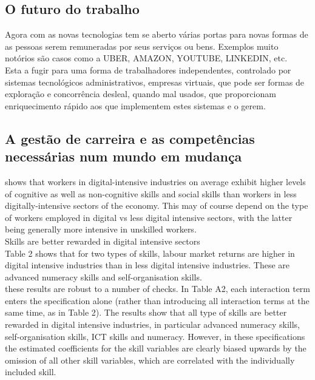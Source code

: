 \subsection{O futuro do trabalho}
\qquad Agora com as novas tecnologias tem se aberto várias portas para novas formas de as pessoas serem remuneradas por seus serviços ou bens. Exemplos muito notórios são casos como a UBER, AMAZON, YOUTUBE, LINKEDIN, etc.\\

Esta a fugir para uma forma de trabalhadores independentes, controlado por sistemas tecnológicos administrativos, empresas virtuais, que pode ser formas de exploração e concorrência desleal, quando mal usados, que proporcionam enriquecimento rápido aos que implementem estes sistemas e o gerem.



\subsection{A gestão de carreira e as competências necessárias num mundo em mudança}

shows that workers in digital-intensive industries on average exhibit higher levels of cognitive as well as non-cognitive skills and social skills than workers in less digitally-intensive sectors of the economy. This may of course depend on the type of workers employed in digital vs less digital intensive sectors, with the latter being generally more intensive in unskilled workers.\\

Skills are better rewarded in digital intensive sectors\\

Table 2 shows that for two types of skills, labour market returns are higher in digital intensive industries than in less digital intensive industries. These are advanced numeracy skills and self-organisation skills.\\

these results are robust to a number of checks. In Table A2, each interaction term enters the specification alone (rather than introducing all interaction terms at the same time, as in Table 2). The results show that all type of skills are better rewarded in digital intensive industries, in particular advanced numeracy skills, self-organisation skills, ICT skills and numeracy. However, in these specifications the estimated coefficients for the skill variables are clearly biased upwards by the omission of all other skill variables, which are correlated with the individually included skill.\\

